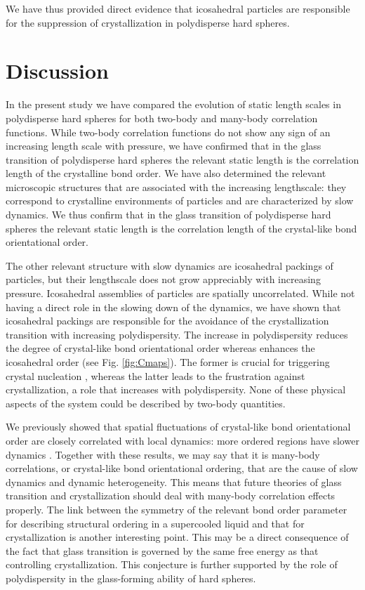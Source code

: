 \documentclass[twocolumn,superscriptaddress]{revtex4}
\begin{document}
We have thus provided direct evidence that icosahedral particles are responsible for the suppression
of crystallization in polydisperse hard spheres.

\section{Discussion}\label{sec:discussion}

In the present study we have compared the evolution of static length scales in polydisperse hard spheres
for both two-body and many-body correlation functions. While two-body correlation functions do not
show any sign of an increasing length scale with pressure, we have confirmed that in the glass transition of polydisperse hard spheres the relevant static length is the correlation length of the crystalline bond order.
We have also determined the relevant microscopic structures that are associated with the increasing
lengthscale: they correspond to crystalline environments of particles and are characterized by slow
dynamics.
We thus confirm that in the glass transition of polydisperse hard spheres the relevant static length is the correlation length of the crystal-like bond orientational order.

The other relevant structure with slow dynamics are icosahedral packings of particles, but
their lengthscale does not grow appreciably with increasing pressure. Icosahedral assemblies of particles
are spatially uncorrelated. While not having a direct role in the slowing down of the dynamics, we
have shown that icosahedral packings are responsible for the avoidance of the crystallization transition
with increasing polydispersity.
The increase in polydispersity reduces the degree of crystal-like bond orientational order whereas enhances the icosahedral order (see Fig. \ref{fig:Cmaps}). 
The former is crucial for triggering 
crystal nucleation \cite{russo_hs}, whereas the latter leads to the frustration against crystallization, a role that increases with polydispersity. None of these physical aspects of the system could be described by two-body quantities. 

We previously showed that spatial fluctuations of crystal-like bond orientational order are closely correlated with local dynamics: 
more ordered regions have slower dynamics \cite{KAT,WT,ShintaniNP,tanaka,Kawasaki3D,mathieu_icosahedra}. 
Together with these results, we may say that it is many-body correlations, or crystal-like bond orientational ordering, that 
are the cause of slow dynamics and dynamic heterogeneity.  
This means that future theories of glass transition and crystallization should deal with many-body correlation effects properly. 
The link between the symmetry of the relevant bond order parameter for describing structural ordering 
in a supercooled liquid and that for crystallization is another interesting point. 
This may be a direct consequence of the fact that glass transition is governed by the same free energy as that 
controlling crystallization. This conjecture is further supported by the role of 
polydispersity in the glass-forming ability of hard spheres.  
\end{document}
